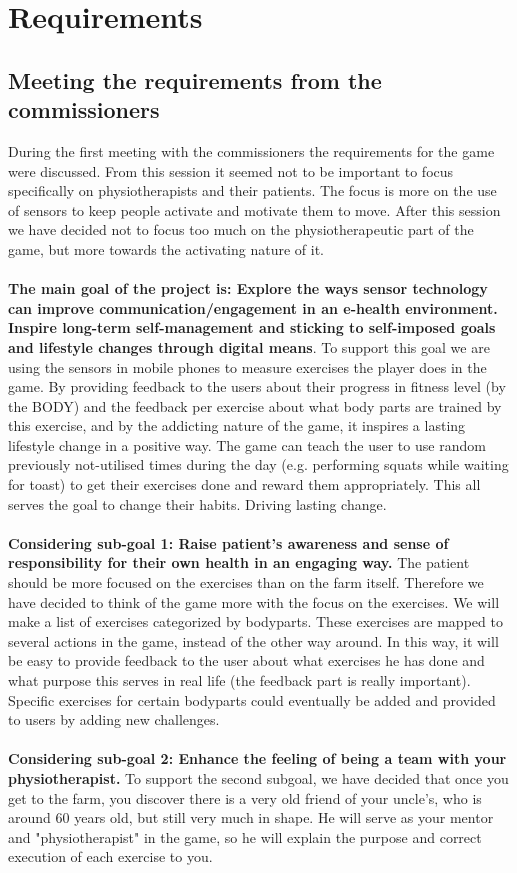 \documentclass[a4paper,11pt,notitlepage]{report}
\begin{document}
\section{Requirements}
\subsection{Meeting the requirements from the commissioners}
During the first meeting with the commissioners the requirements for the game were discussed.  From this session it seemed not to be important to focus specifically on physiotherapists and their patients. The focus is more on the use of sensors to keep people activate and motivate them to move. After this session we have decided not to focus too much on the physiotherapeutic part of the game, but more towards the activating nature of it.
\\\\
\textbf{The main goal of the project is: Explore the ways sensor technology can improve communication/engagement in an e-health environment. Inspire long-term self-management and sticking to self-imposed goals and lifestyle changes through digital means}. To support this goal we are using the sensors in mobile phones to measure exercises the player does in the game. By providing feedback to the users about their progress in fitness level (by the BODY) and the feedback per exercise about what body parts are trained by this exercise, and by the addicting nature of the game, it inspires a lasting lifestyle change in a positive way. The game can teach the user to use random previously not-utilised times during the day (e.g. performing squats while waiting for toast) to get their exercises done and reward them appropriately. This all serves the goal to change their habits. Driving lasting change.
\\\\
\textbf{Considering sub-goal 1: Raise patient’s awareness and sense of responsibility for their own health in an engaging way.}
The patient should be more focused on the exercises than on the farm itself. Therefore we have decided to think of the game more with the focus on the exercises. We will make a list of exercises categorized by bodyparts. These exercises are mapped to several actions in the game, instead of the other way around. In this way, it will  be easy to provide feedback to the user about what exercises he has done and what purpose this serves in real life (the feedback part is really important). Specific exercises for certain bodyparts could eventually be added and provided to users by adding new challenges.
\\\\
\textbf{Considering sub-goal 2: Enhance the feeling of being a team with your physiotherapist.}
To support the second subgoal, we have decided that once you get to the farm, you discover there is a very old friend of your uncle's, who is around 60 years old, but still very much in shape. He will serve as your mentor and "physiotherapist" in the game, so he will explain the purpose and correct execution of each exercise to you.
\end{document}
